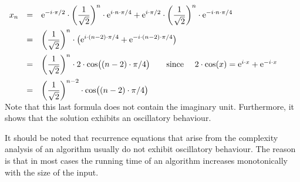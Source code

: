 \\[0.2cm]
\hspace*{1.3cm}
$
\begin{array}{lcl}
  x_n & = & \displaystyle  \mathrm{e}^{-i \cdot\pi/2} \cdot \left(\frac{1}{\sqrt{2}}\right)^n \cdot \mathrm{e}^{ i \cdot n \cdot\pi/4}
               + \mathrm{e}^{ i \cdot\pi/2} \cdot \left(\frac{1}{\sqrt{2}}\right)^n \cdot \mathrm{e}^{-i \cdot n \cdot\pi/4}
  \\[0.4cm]
  & = & \displaystyle \left(\frac{1}{\sqrt{2}}\right)^n \cdot \bigl(
        \mathrm{e}^{i \cdot (n - 2) \cdot \pi / 4} + \mathrm{e}^{-i \cdot (n - 2) \cdot \pi / 4} \bigr) \\[0.4cm]
  & = & \displaystyle \left(\frac{1}{\sqrt{2}}\right)^n \cdot 2 \cdot
        \cos\bigl((n - 2) \cdot \pi / 4\bigr) \qquad 
        \mbox{since \quad $2 \cdot \cos(x) = \mathrm{e}^{i\cdot x} + \mathrm{e}^{-i\cdot x}$}\\[0.4cm]
    & = & \displaystyle \left(\frac{1}{\sqrt{2}}\right)^{n-2} \cdot \cos\bigl((n - 2) \cdot \pi / 4\bigr)
\end{array}
$
\\[0.2cm]
Note that this last formula does not contain the imaginary unit.  Furthermore, it shows that the solution
exhibits an oscillatory behaviour.
\vspace*{0.2cm}

\remark
It should be noted that recurrence equations that arise from the complexity analysis of an algorithm usually do
not exhibit oscillatory behaviour.  The reason is that in most cases the running time of an algorithm increases
monotonically with the size of the input. \eoxs

